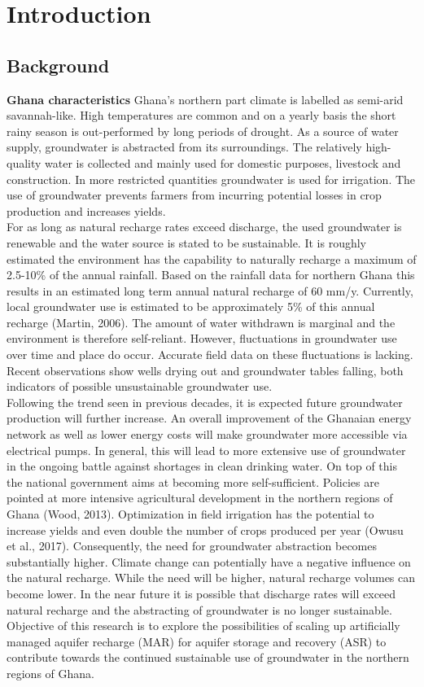 \chapter{Introduction}

\section{Background}
\textbf{Ghana characteristics}
Ghana’s northern part climate is labelled as semi-arid savannah-like. High temperatures are common and on a yearly basis the short rainy season is out-performed by long periods of drought. As a source of water supply, groundwater is abstracted from its surroundings. The relatively high-quality water is collected and mainly used for domestic purposes, livestock and construction. In more restricted quantities groundwater is used for irrigation. The use of groundwater prevents farmers from incurring potential losses in crop production and increases yields. \bigskip\\
For as long as natural recharge rates exceed discharge, the used groundwater is renewable and the water source is stated to be sustainable. It is roughly estimated the environment has the capability to naturally recharge a maximum of 2.5-10\% of the annual rainfall. Based on the rainfall data for northern Ghana this results in an estimated long term annual natural recharge of 60 mm/y. Currently, local groundwater use is estimated to be approximately 5\% of this annual recharge (Martin, 2006). The amount of water withdrawn is marginal and the environment is therefore self-reliant. However, fluctuations in groundwater use over time and place do occur. Accurate field data on these fluctuations is lacking. Recent observations show wells drying out and groundwater tables falling, both indicators of possible unsustainable groundwater use.
\bigskip\\
Following the trend seen in previous decades, it is expected future groundwater production will further increase. An overall improvement of the Ghanaian energy network as well as lower energy costs will make groundwater more accessible via electrical pumps. In general, this will lead to more extensive use of groundwater in the ongoing battle against shortages in clean drinking water. On top of this the national government aims at becoming more self-sufficient. Policies are pointed at more intensive agricultural development in the northern regions of Ghana (Wood, 2013). Optimization in field irrigation has the potential to increase yields and even double the number of crops produced per year (Owusu et al., 2017). Consequently, the need for groundwater abstraction becomes substantially higher. Climate change can potentially have a negative influence on the natural recharge. While the need will be higher, natural recharge volumes can become lower. In the near future it is possible that discharge rates will exceed natural recharge and the abstracting of groundwater is no longer sustainable. Objective of this research is to explore the possibilities of scaling up artificially managed aquifer recharge (MAR) for aquifer storage and recovery (ASR) to contribute towards the continued sustainable use of groundwater in the northern regions of Ghana. 

